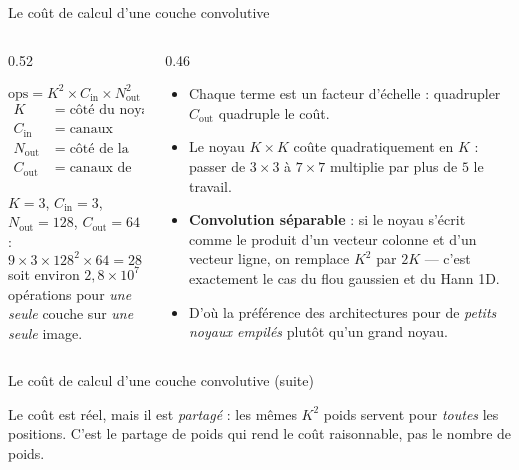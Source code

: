 \begin{frame}{Le coût de calcul d'une couche convolutive}
\begin{columns}[t]
\begin{column}{0.52\textwidth}
\begin{kbox}
\[
\text{ops} = K^2 \times C_{\text{in}} \times N_{\text{out}}^2 \times C_{\text{out}}
\]
\[
\begin{aligned}
K &= \text{côté du noyau},\\
C_{\text{in}} &= \text{canaux d'entrée},\\
N_{\text{out}} &= \text{côté de la carte de sortie},\\
C_{\text{out}} &= \text{canaux de sortie}.
\end{aligned}
\]
\end{kbox}
\begin{ebox}
$K = 3$, $C_{\text{in}} = 3$, $N_{\text{out}} = 128$,
$C_{\text{out}} = 64$ :
\[
9 \times 3 \times 128^2 \times 64 = 28\,311\,552
\]
soit environ $2{,}8 \times 10^7$ opérations pour \emph{une seule} couche
sur \emph{une seule} image.
\end{ebox}
\end{column}
\begin{column}{0.46\textwidth}
\begin{itemize}
  \item Chaque terme est un facteur d'échelle : quadrupler $C_{\text{out}}$
  quadruple le coût.
  \item Le noyau $K \times K$ coûte quadratiquement en $K$ : passer de
  $3\times3$ à $7\times7$ multiplie par plus de $5$ le travail.
  \item \textbf{Convolution séparable} : si le noyau s'écrit comme le produit
  d'un vecteur colonne et d'un vecteur ligne, on remplace $K^2$ par $2K$ ---
  c'est exactement le cas du flou gaussien et du Hann 1D.
  \item D'où la préférence des architectures pour de \emph{petits noyaux
  empilés} plutôt qu'un grand noyau.
\end{itemize}

\end{column}
\end{columns}
\end{frame}
\begin{frame}{Le coût de calcul d'une couche convolutive (suite)}
\begin{wbox}
Le coût est réel, mais il est \emph{partagé} : les mêmes $K^2$ poids servent
pour \emph{toutes} les positions. C'est le partage de poids qui rend le coût
raisonnable, pas le nombre de poids.
\end{wbox}
\end{frame}

